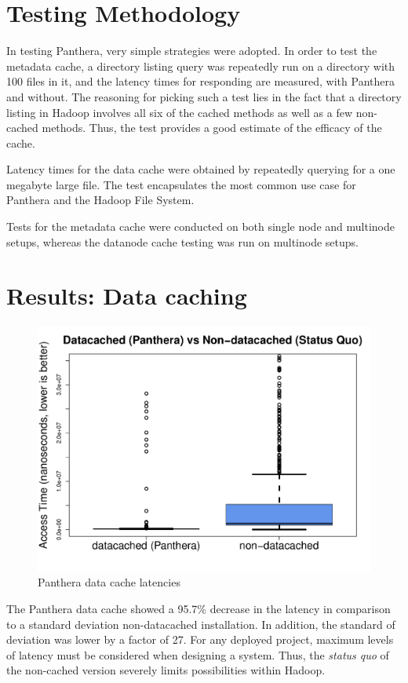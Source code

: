 \documentclass{article}
\begin{document}
\section{Testing Methodology}

In testing Panthera, very simple strategies were adopted. In order to test the metadata cache, a directory listing query was repeatedly run on a directory with 100 files in it, and the latency times for responding are measured, with Panthera and without. The reasoning for picking such a test lies in the fact that a directory listing in Hadoop involves all six of the cached methods as well as a few non-cached methods. Thus, the test provides a good estimate of the efficacy of the cache.

Latency times for the data cache were obtained by repeatedly querying for a one megabyte large file. The test encapsulates the most common use case for Panthera and the Hadoop File System.

Tests for the metadata cache were conducted on both single node and multinode setups, whereas the datanode cache testing was run on multinode setups.

\section{Results: Data caching}
\begin{figure}[!h]
	\caption{Panthera data cache latencies}
	\centering
		\includegraphics[scale=0.4]{assets/box-plot-data.pdf}
\end{figure}

The Panthera data cache showed a 95.7\% decrease in the latency in comparison to a standard deviation non-datacached installation. In addition, the standard of deviation was lower by a factor of 27. For any deployed project, maximum levels of latency must be considered when designing a system. Thus, the \textit{status quo} of the non-cached version severely limits possibilities within Hadoop.
\end{document}
